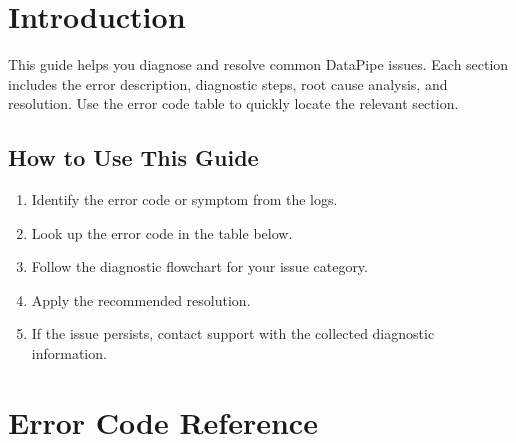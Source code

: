 \documentclass[
    language=english,
    doctype=manual,
    institution=none,
    titlestyle=book,
    oneside,
]{../../omnilatex}
\begin{document}
\maketitle

\tableofcontents

\chapter{Introduction}
\label{sec:introduction}

This guide helps you diagnose and resolve common DataPipe issues. Each
section includes the error description, diagnostic steps, root cause
analysis, and resolution. Use the error code table to quickly locate the
relevant section.

\section{How to Use This Guide}

\begin{enumerate}
    \item Identify the error code or symptom from the logs.
    \item Look up the error code in the table below.
    \item Follow the diagnostic flowchart for your issue category.
    \item Apply the recommended resolution.
    \item If the issue persists, contact support with the collected
        diagnostic information.
\end{enumerate}

\chapter{Error Code Reference}
\label{sec:error-codes}
\end{document}
